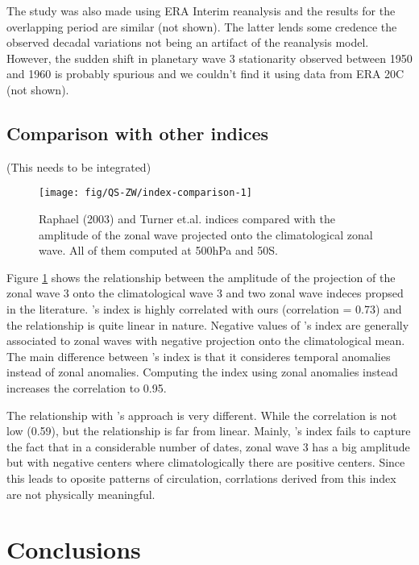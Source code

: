 \documentclass[draft,linenumbers]{agujournal2018}
\begin{document}
The study was also made using ERA Interim reanalysis and the results for
the overlapping period are similar (not shown). The latter lends some
credence the observed decadal variations not being an artifact of the
reanalysis model. However, the sudden shift in planetary wave 3
stationarity observed between 1950 and 1960 is probably spurious and we
couldn't find it using data from ERA 20C (not shown).

\subsection{Comparison with other indices}

(This needs to be integrated)

\begin{figure}[h]

{\centering \texttt{[image: fig/QS-ZW/index-comparison-1]} 

}

\caption{Raphael (2003) and Turner et.al. indices compared with the amplitude of the zonal wave projected onto the climatological zonal wave. All of them computed at 500hPa and 50\degree S.}\label{fig:index-comparison}
\end{figure}

Figure \ref{fig:index-comparison} shows the relationship between the
amplitude of the projection of the zonal wave 3 onto the climatological
wave 3 and two zonal wave indeces propsed in the literature.
\citet{raphael2004b}'s index is highly correlated with ours (correlation
= 0.73) and the relationship is quite linear in nature. Negative values
of \citet{raphael2004b}'s index are generally associated to zonal waves
with negative projection onto the climatological mean. The main
difference between \citet{raphael2004b}'s index is that it consideres
temporal anomalies instead of zonal anomalies. Computing the index using
zonal anomalies instead increases the correlation to 0.95.

The relationship with \citet{turner2017}'s approach is very different.
While the correlation is not low (0.59), but the relationship is far
from linear. Mainly, \citet{turner2017}'s index fails to capture the
fact that in a considerable number of dates, zonal wave 3 has a big
amplitude but with negative centers where climatologically there are
positive centers. Since this leads to oposite patterns of circulation,
corrlations derived from this index are not physically meaningful.

\section{Conclusions}
\end{document}
